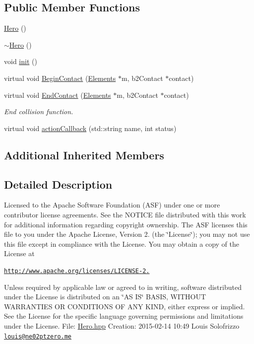 \subsection*{Public Member Functions}
\begin{DoxyCompactItemize}
\item 
\hyperlink{class_hero_ab5920677a4b5cb59d6f513922d037dca}{Hero} ()
\item 
\hyperlink{class_hero_a5aeef41ede5a80dc29c5acd7b553c4da}{$\sim$\-Hero} ()
\item 
void \hyperlink{class_hero_ae67cc4b7770083755895b78664d0ea34}{init} ()
\item 
virtual void \hyperlink{class_hero_ac23c090d8f5e2768b4175580a0d53d1b}{Begin\-Contact} (\hyperlink{class_elements}{Elements} $\ast$m, b2\-Contact $\ast$contact)
\item 
virtual void \hyperlink{class_hero_a9fee92d1b0df478f95bc10ba84015d2a}{End\-Contact} (\hyperlink{class_elements}{Elements} $\ast$m, b2\-Contact $\ast$contact)
\begin{DoxyCompactList}\small\item\em End collision function. \end{DoxyCompactList}\item 
virtual void \hyperlink{class_hero_aa41ef53abd25057ceb431811ccf80ad5}{action\-Callback} (std\-::string name, int status)
\end{DoxyCompactItemize}
\subsection*{Additional Inherited Members}


\subsection{Detailed Description}
Licensed to the Apache Software Foundation (A\-S\-F) under one or more contributor license agreements. See the N\-O\-T\-I\-C\-E file distributed with this work for additional information regarding copyright ownership. The A\-S\-F licenses this file to you under the Apache License, Version 2. (the \char`\"{}\-License\char`\"{}); you may not use this file except in compliance with the License. You may obtain a copy of the License at

\href{http://www.apache.org/licenses/LICENSE-2.0}{\tt http\-://www.\-apache.\-org/licenses/\-L\-I\-C\-E\-N\-S\-E-\/2.}

Unless required by applicable law or agreed to in writing, software distributed under the License is distributed on an \char`\"{}\-A\-S I\-S\char`\"{} B\-A\-S\-I\-S, W\-I\-T\-H\-O\-U\-T W\-A\-R\-R\-A\-N\-T\-I\-E\-S O\-R C\-O\-N\-D\-I\-T\-I\-O\-N\-S O\-F A\-N\-Y K\-I\-N\-D, either express or implied. See the License for the specific language governing permissions and limitations under the License. File\-: \hyperlink{_hero_8hpp}{Hero.\-hpp} Creation\-: 2015-\/02-\/14 10\-:49 Louis Solofrizzo \href{mailto:louis@ne02ptzero.me}{\tt louis@ne02ptzero.\-me} 

